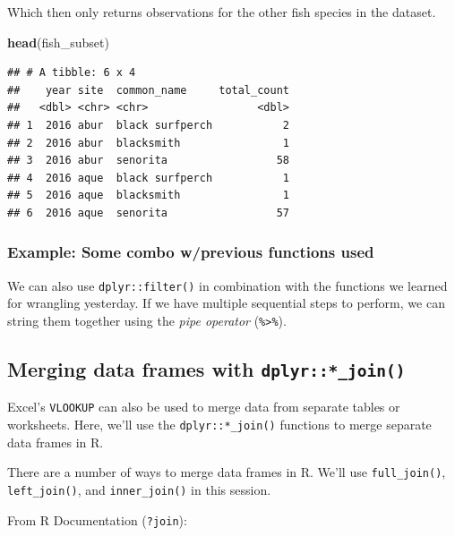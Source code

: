\documentclass[]{book}
\newenvironment{Shaded}{\begin{snugshade}}{\end{snugshade}}
\newcommand{\KeywordTok}[1]{\textcolor[rgb]{0.13,0.29,0.53}{\textbf{#1}}}
\newcommand{\NormalTok}[1]{#1}
\begin{document}
Which then only returns observations for the other fish species in the dataset.

\begin{Shaded}
\begin{Highlighting}[]
\KeywordTok{head}\NormalTok{(fish_subset)}
\end{Highlighting}
\end{Shaded}

\begin{verbatim}
## # A tibble: 6 x 4
##    year site  common_name     total_count
##   <dbl> <chr> <chr>                 <dbl>
## 1  2016 abur  black surfperch           2
## 2  2016 abur  blacksmith                1
## 3  2016 abur  senorita                 58
## 4  2016 aque  black surfperch           1
## 5  2016 aque  blacksmith                1
## 6  2016 aque  senorita                 57
\end{verbatim}

\hypertarget{example-some-combo-wprevious-functions-used}{%
\subsubsection{Example: Some combo w/previous functions used}\label{example-some-combo-wprevious-functions-used}}

We can also use \texttt{dplyr::filter()} in combination with the functions we learned for wrangling yesterday. If we have multiple sequential steps to perform, we can string them together using the \emph{pipe operator} (\texttt{\%\textgreater{}\%}).

\hypertarget{merging-data-frames-with-dplyr_join}{%
\subsection{\texorpdfstring{Merging data frames with \texttt{dplyr::*\_join()}}{Merging data frames with dplyr::*\_join()}}\label{merging-data-frames-with-dplyr_join}}

Excel's \texttt{VLOOKUP} can also be used to merge data from separate tables or worksheets. Here, we'll use the \texttt{dplyr::*\_join()} functions to merge separate data frames in R.

There are a number of ways to merge data frames in R. We'll use \texttt{full\_join()}, \texttt{left\_join()}, and \texttt{inner\_join()} in this session.

From R Documentation (\texttt{?join}):
\end{document}
